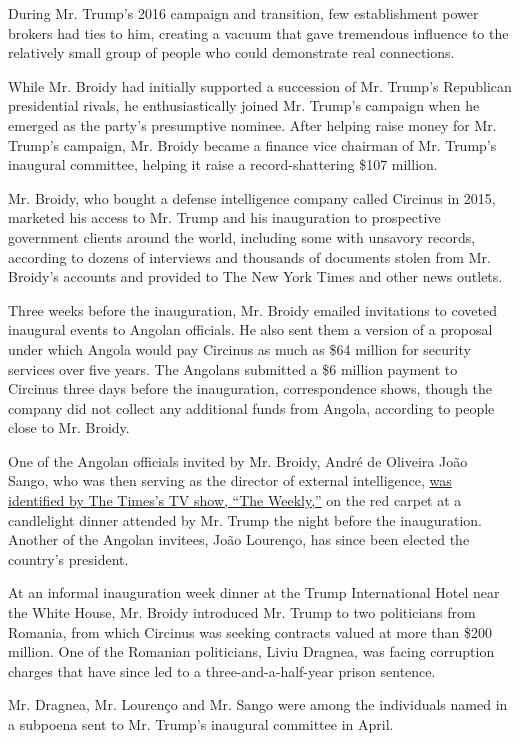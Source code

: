 During Mr. Trump's 2016 campaign and transition, few establishment power
brokers had ties to him, creating a vacuum that gave tremendous
influence to the relatively small group of people who could demonstrate
real connections.

While Mr. Broidy had initially supported a succession of Mr. Trump's
Republican presidential rivals, he enthusiastically joined Mr. Trump's
campaign when he emerged as the party's presumptive nominee. After
helping raise money for Mr. Trump's campaign, Mr. Broidy became a
finance vice chairman of Mr. Trump's inaugural committee, helping it
raise a record-shattering \$107 million.

Mr. Broidy, who bought a defense intelligence company called Circinus in
2015, marketed his access to Mr. Trump and his inauguration to
prospective government clients around the world, including some with
unsavory records, according to dozens of interviews and thousands of
documents stolen from Mr. Broidy's accounts and provided to The New York
Times and other news outlets.

Three weeks before the inauguration, Mr. Broidy emailed invitations to
coveted inaugural events to Angolan officials. He also sent them a
version of a proposal under which Angola would pay Circinus as much as
\$64 million for security services over five years. The Angolans
submitted a \$6 million payment to Circinus three days before the
inauguration, correspondence shows, though the company did not collect
any additional funds from Angola, according to people close to Mr.
Broidy.

One of the Angolan officials invited by Mr. Broidy, André de Oliveira
João Sango, who was then serving as the director of external
intelligence,
\href{https://www.nytimes.com/2019/06/26/the-weekly/trump-inauguration-expensive.html}{was
identified by The Times's TV show, ``The Weekly,''} on the red carpet at
a candlelight dinner attended by Mr. Trump the night before the
inauguration. Another of the Angolan invitees, João Lourenço, has since
been elected the country's president.

At an informal inauguration week dinner at the Trump International Hotel
near the White House, Mr. Broidy introduced Mr. Trump to two politicians
from Romania, from which Circinus was seeking contracts valued at more
than \$200 million. One of the Romanian politicians, Liviu Dragnea, was
facing corruption charges that have since led to a three-and-a-half-year
prison sentence.

Mr. Dragnea, Mr. Lourenço and Mr. Sango were among the individuals named
in a subpoena sent to Mr. Trump's inaugural committee in April.

